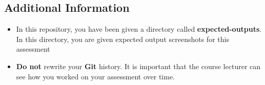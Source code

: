 \documentclass{article}
\begin{document}
\subsection*{Additional Information}
\begin{itemize}
	\item In this repository, you have been given a directory called \textbf{expected-outputs}. In this directory, you are given expected output screenshots for this assessment
	\item \textbf{Do not} rewrite your \textbf{Git} history. It is important that the course lecturer can see how you worked on your assessment over time.
\end{itemize}
\end{document}
